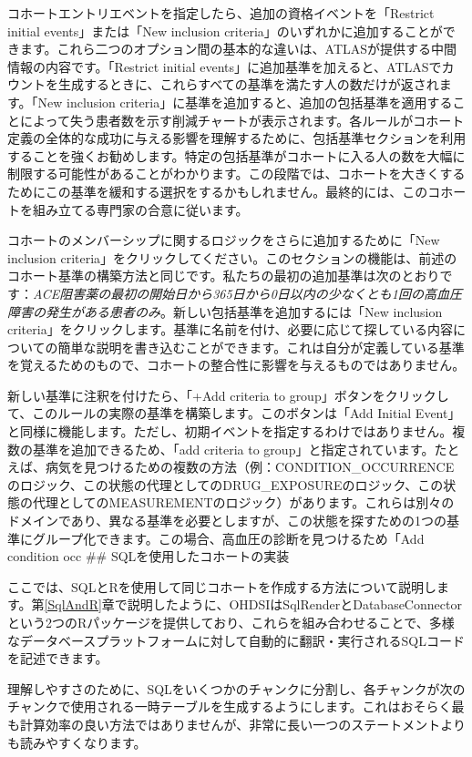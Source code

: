 \documentclass[
  11pt]{book}
\theoremstyle{definition}
\theoremstyle{definition}
\theoremstyle{definition}
\theoremstyle{definition}
\theoremstyle{remark}
\begin{document}
コホートエントリエベントを指定したら、追加の資格イベントを「Restrict initial events」または「New inclusion criteria」のいずれかに追加することができます。これら二つのオプション間の基本的な違いは、ATLASが提供する中間情報の内容です。「Restrict initial events」に追加基準を加えると、ATLASでカウントを生成するときに、これらすべての基準を満たす人の数だけが返されます。「New inclusion criteria」に基準を追加すると、追加の包括基準を適用することによって失う患者数を示す削減チャートが表示されます。各ルールがコホート定義の全体的な成功に与える影響を理解するために、包括基準セクションを利用することを強くお勧めします。特定の包括基準がコホートに入る人の数を大幅に制限する可能性があることがわかります。この段階では、コホートを大きくするためにこの基準を緩和する選択をするかもしれません。最終的には、このコホートを組み立てる専門家の合意に従います。

コホートのメンバーシップに関するロジックをさらに追加するために「New inclusion criteria」をクリックしてください。このセクションの機能は、前述のコホート基準の構築方法と同じです。私たちの最初の追加基準は次のとおりです：\emph{ACE阻害薬の最初の開始日から365日から0日以内の少なくとも1回の高血圧障害の発生がある患者のみ}。新しい包括基準を追加するには「New inclusion criteria」をクリックします。基準に名前を付け、必要に応じて探している内容についての簡単な説明を書き込むことができます。これは自分が定義している基準を覚えるためのもので、コホートの整合性に影響を与えるものではありません。

新しい基準に注釈を付けたら、「+Add criteria to group」ボタンをクリックして、このルールの実際の基準を構築します。このボタンは「Add Initial Event」と同様に機能します。ただし、初期イベントを指定するわけではありません。複数の基準を追加できるため、「add criteria to group」と指定されています。たとえば、病気を見つけるための複数の方法（例：CONDITION\_OCCURRENCEのロジック、この状態の代理としてのDRUG\_EXPOSUREのロジック、この状態の代理としてのMEASUREMENTのロジック）があります。これらは別々のドメインであり、異なる基準を必要としますが、この状態を探すための1つの基準にグループ化できます。この場合、高血圧の診断を見つけるため「Add condition occ
\#\# SQLを使用したコホートの実装

ここでは、SQLとRを使用して同じコホートを作成する方法について説明します。第\ref{SqlAndR}章で説明したように、OHDSIはSqlRenderとDatabaseConnectorという2つのRパッケージを提供しており、これらを組み合わせることで、多様なデータベースプラットフォームに対して自動的に翻訳・実行されるSQLコードを記述できます。

理解しやすさのために、SQLをいくつかのチャンクに分割し、各チャンクが次のチャンクで使用される一時テーブルを生成するようにします。これはおそらく最も計算効率の良い方法ではありませんが、非常に長い一つのステートメントよりも読みやすくなります。
\end{document}
